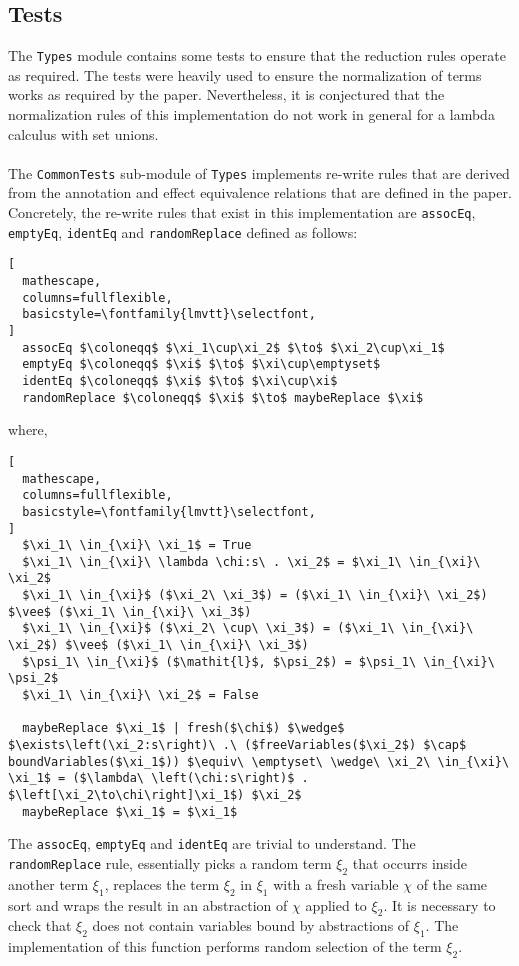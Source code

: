 \documentclass[8pt]{extarticle}
\begin{document}
\subsection{Tests}
The \verb+Types+ module contains some tests to ensure that the reduction rules operate as required. The tests were heavily used to ensure the normalization of terms works as required by the paper. Nevertheless, it is conjectured that the normalization rules of this implementation do not work in general for a lambda calculus with set unions.
\\\\
The \verb+CommonTests+ sub-module of \verb+Types+ implements re-write rules that are derived from the annotation and effect equivalence relations that are defined in the paper. Concretely, the re-write rules that exist in this implementation are \verb+assocEq+, \verb+emptyEq+, \verb+identEq+ and \verb+randomReplace+ defined as follows:
\begin{lstlisting}[
  mathescape,
  columns=fullflexible,
  basicstyle=\fontfamily{lmvtt}\selectfont,
]
  assocEq $\coloneqq$ $\xi_1\cup\xi_2$ $\to$ $\xi_2\cup\xi_1$
  emptyEq $\coloneqq$ $\xi$ $\to$ $\xi\cup\emptyset$
  identEq $\coloneqq$ $\xi$ $\to$ $\xi\cup\xi$
  randomReplace $\coloneqq$ $\xi$ $\to$ maybeReplace $\xi$
\end{lstlisting}
where,
\begin{lstlisting}[
  mathescape,
  columns=fullflexible,
  basicstyle=\fontfamily{lmvtt}\selectfont,
]
  $\xi_1\ \in_{\xi}\ \xi_1$ = True
  $\xi_1\ \in_{\xi}\ \lambda \chi:s\ . \xi_2$ = $\xi_1\ \in_{\xi}\ \xi_2$
  $\xi_1\ \in_{\xi}$ ($\xi_2\ \xi_3$) = ($\xi_1\ \in_{\xi}\ \xi_2$) $\vee$ ($\xi_1\ \in_{\xi}\ \xi_3$)
  $\xi_1\ \in_{\xi}$ ($\xi_2\ \cup\ \xi_3$) = ($\xi_1\ \in_{\xi}\ \xi_2$) $\vee$ ($\xi_1\ \in_{\xi}\ \xi_3$)
  $\psi_1\ \in_{\xi}$ ($\mathit{l}$, $\psi_2$) = $\psi_1\ \in_{\xi}\ \psi_2$
  $\xi_1\ \in_{\xi}\ \xi_2$ = False

  maybeReplace $\xi_1$ | fresh($\chi$) $\wedge$ $\exists\left(\xi_2:s\right)\ .\ ($freeVariables($\xi_2$) $\cap$ boundVariables($\xi_1$)) $\equiv\ \emptyset\ \wedge\ \xi_2\ \in_{\xi}\ \xi_1$ = ($\lambda\ \left(\chi:s\right)$ . $\left[\xi_2\to\chi\right]\xi_1$) $\xi_2$
  maybeReplace $\xi_1$ = $\xi_1$
\end{lstlisting}
The \verb+assocEq+, \verb+emptyEq+ and \verb+identEq+ are trivial to understand. The \verb+randomReplace+ rule, essentially picks a random term $\xi_2$ that occurrs inside another term $\xi_1$, replaces the term $\xi_2$ in $\xi_1$ with a fresh variable $\chi$ of the same sort and wraps the result in an abstraction of $\chi$ applied to $\xi_2$. It is necessary to check that $\xi_2$ does not contain variables bound by abstractions of $\xi_1$. The implementation of this function performs random selection of the term $\xi_2$.
\end{document}
